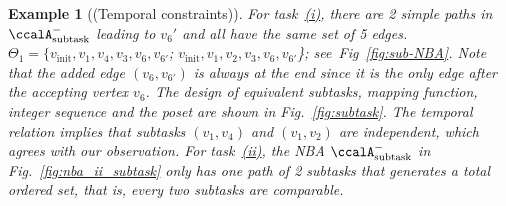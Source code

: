\documentclass[Afour,sageh,times]{sagej}
\newtheorem{exmp}{Example}
\newcommand{\auto}[1]{\ccalA_{\text{#1}}}
\newenvironment{cexmp}
{\addtocounter{exmp}{-1}\begin{exmp}}
  {\end{exmp}}
\begin{document}
\begin{cexmp}[(Temporal constraints)]
  For task~\hyperref[task:i]{\it (i)}, there are 2 simple paths in $\auto{subtask}^-$ leading to $v_6'$ and all have the same set of 5 edges.  $\Theta_1 = \{v_\text{init},v_1, v_4,v_3,v_6,v_{6'}$; $v_\text{init}, v_1, v_2,v_3, v_6, v_{6'}$\}; see~Fig~\ref{fig:sub-NBA}. Note that the added edge $(v_6, v_{6'})$ is always at the end since it is the only edge after the accepting vertex $v_6$. The design of equivalent subtasks, mapping function, integer sequence and the poset are shown in Fig.~\ref{fig:subtask}. The temporal relation implies that subtasks $(v_1, v_4)$ and $(v_1, v_2)$ are independent, which agrees with our observation. For task~\hyperref[task:ii]{\it (ii)}, the NBA $\auto{subtask}^-$ in Fig.~\ref{fig:nba_ii_subtask} only has one path of 2 subtasks that generates a total ordered set, that is, every two subtasks are comparable.
\end{cexmp}


\end{document}
